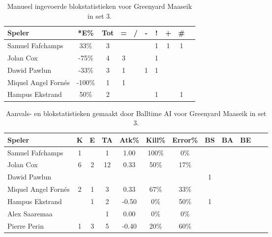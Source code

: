 \begin{table}[ht!]
    \centering
    \scriptsize
    \begin{tabular}{|l|c|c|c|c|c|c|c|c|c|} \hline
        \textbf{Speler} & *E\% & Tot & = & / & - & ! & + & \#\\ \hline
        Samuel Fafchamps & 33\% & 3 &  &  &  & 1 & 1 & 1 \\ 
        Jolan Cox & -75\% & 4 & 3 &  &  & 1 &  & \\ 
        Dawid Pawlun & -33\% & 3 & 1 &  & 1 & 1 &  &  \\ 
        Miquel Angel Fornés & -100\% & 1 & 1 &  &  &  &  & \\ 
        Hampus Ekstrand & 50\% & 2 &  &  &  & 1 &  & 1 \\  \hline
    \end{tabular}
    \caption[Manueel ingevoerde blokstatistieken voor Greenyard Maaseik in set 3]{\label{tab:PL3BlockMaaseikMan3}Manueel ingevoerde blokstatistieken voor Greenyard Maaseik in set 3.}
\end{table}

\begin{table}[ht!]
  \centering
  \scriptsize
  \begin{tabular}{|l|c|c|c|c|c|c|c|c|c|c|c|} \hline
    \textbf{Speler} & K & E & TA & Atk\% & Kill\% & Error\% & BS & BA & BE \\ \hline
    Samuel Fafchamps & 1 &  & 1 & 1.00 & 100\% & 0\% &  &   &  \\
    Jolan Cox & 6 & 2 & 12 & 0.33 & 50\% & 17\% &  &   &  \\
    Dawid Pawlun &   &   &   &   &   &   & 1 & & \\
    Miquel Angel Fornés & 2 & 1 & 3 & 0.33 & 67\% & 33\% &  &   &  \\
    Hampus Ekstrand &  & 1 & 2 & -0.50 & 0\% & 50\% & 1 & & \\
    Alex Saaremaa &  &  & 1 & 0.00 & 0\% & 0\% &  & &\\
    Pierre Perin & 1 & 3 & 5 & -0.40 & 20\% & 60\% & &  & \\  \hline
  \end{tabular}
  \caption[Aanvals- en blokstatistieken gemaakt door Balltime AI voor Greenyard Maaseik in set 3]{\label{tab:PL3AttBlockMaaseikAI3}Aanvals- en blokstatistieken gemaakt door Balltime AI voor Greenyard Maaseik in set 3.}
\end{table}

